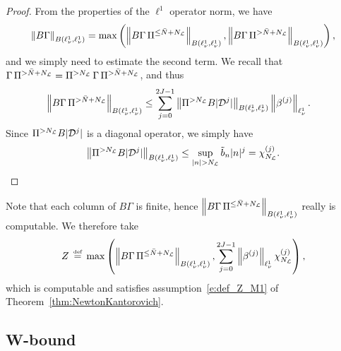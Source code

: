 \documentclass[10pt,a4paper]{article}
\theoremstyle{plain}
\renewcommand{\L}{\mathcal{L}}
\newcommand{\D}{\mathcal{D}}
\newcommand{\bN}{\bar{N}}
\newcommand{\1}{\mathbf{1}}
\newcommand{\bydef}{\,\stackrel{\mbox{\tiny\textnormal{\raisebox{0ex}[0ex][0ex]{def}}}}{=}\,}
\newcommand{\NL}{N_{\text{\tiny{$\L$}}}}
\begin{document}
\begin{proof}
From the properties of the $\ell^1$ operator norm, we have
\begin{align*}
\left\Vert B\Gamma \right\Vert_{B(\ell^1_\nu,\ell^1_\nu)} = \max\left( \left\Vert B\Gamma \, \Pi^{\leq \bN+\NL} \right\Vert_{B(\ell^1_\nu,\ell^1_\nu)}, \left\Vert B\Gamma \, \Pi^{> \bN+\NL} \right\Vert_{B(\ell^1_\nu,\ell^1_\nu)}\right),
\end{align*}
and we simply need to estimate the second term. We recall that $\Gamma \, \Pi^{> \bN+\NL} = \Pi^{> \NL}\, \Gamma \, \Pi^{> \bN+\NL}$, and thus
\begin{align*}
\left\Vert B\Gamma \,\Pi^{> \bN+\NL} \right\Vert_{B(\ell^1_\nu,\ell^1_\nu)} &\leq \sum_{j=0}^{2J-1} \left\Vert \Pi^{> \NL} B \vert \D^{j}\vert \right\Vert_{B(\ell^1_\nu,\ell^1_\nu)} \left\Vert \beta^{(j)}  \right\Vert_{\ell^1_\nu}.
\end{align*}
Since $\Pi^{> \NL} B \vert \D^{j}\vert$ is a diagonal operator, we simply have
\begin{equation*}
\left\Vert \Pi^{> \NL} B \vert \D^{j}\vert \right\Vert_{B(\ell^1_\nu,\ell^1_\nu)} \leq \sup_{\vert n\vert >\NL} \tilde{b}_n \vert n\vert^j =  \chi^{(j)}_{\NL}. \qedhere
\end{equation*}
\end{proof}
%
Note that each column of $B\Gamma$ is finite, hence $\left\Vert B\Gamma \, \Pi^{\leq \bN+\NL} \right\Vert_{B(\ell^1_\nu,\ell^1_\nu)}$ really is computable. We therefore take
\begin{align*}
Z \bydef \max\left( \left\Vert B\Gamma \, \Pi^{\leq \bN+\NL} \right\Vert_{B(\ell^1_\nu,\ell^1_\nu)}, \sum_{j=0}^{2J-1} \left\Vert \beta^{(j)}\right\Vert_{\ell^1_\nu} \chi^{(j)}_{\NL}\right),
\end{align*}
which is computable and satisfies assumption~\eqref{e:def_Z_M1} of Theorem~\ref{thm:NewtonKantorovich}.


\subsection{W-bound}
\label{sec:Wbounds}
\end{document}
